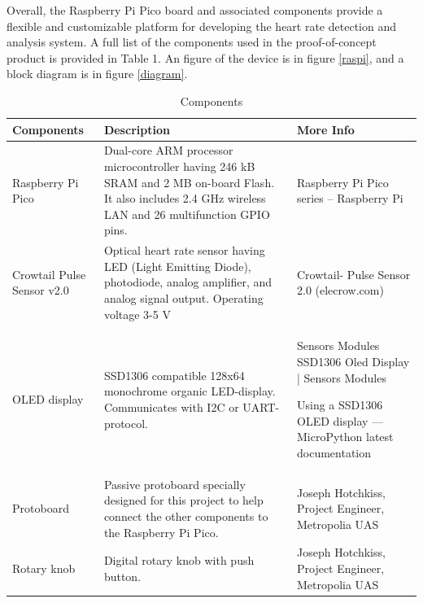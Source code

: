 \documentclass{article}
\begin{document}
Overall, the Raspberry Pi Pico board and associated components provide a flexible and customizable platform for developing the heart rate detection and analysis system. A full list of the components used in the proof-of-concept product is provided in Table 1. An figure of the device is in figure \ref{raspi}, and a block diagram is in figure \ref{diagram}.


\begin{table}[h]
\centering
\begin{tabular}{|p{2cm}|p{5.5cm}|p{4cm}|}
\hline
\textbf{Components} & \textbf{Description} & \textbf{More Info} \\ \hline
Raspberry Pi Pico & Dual-core ARM processor microcontroller having 246 kB SRAM and 2 MB on-board Flash. It also includes 2.4 GHz wireless LAN and 26 multifunction GPIO pins.    & Raspberry Pi Pico series – Raspberry Pi    \\ \hline
Crowtail Pulse Sensor v2.0   & Optical heart rate sensor having LED (Light Emitting Diode), photodiode, analog amplifier, and analog signal output. Operating voltage 3-5 V  & Crowtail- Pulse Sensor 2.0 (elecrow.com)   \\ \hline
OLED display   & SSD1306 compatible 128x64 monochrome organic LED-display. Communicates with I2C or UART-protocol.    & Sensors Modules SSD1306 Oled Display | Sensors Modules

Using a SSD1306 OLED display — MicroPython latest documentation    \\ \hline
Protoboard   & Passive protoboard specially designed for this project to help connect the other components to the Raspberry Pi Pico.   & Joseph Hotchkiss, Project Engineer, Metropolia UAS   \\ \hline
Rotary knob  & Digital rotary knob with push button.    & Joseph Hotchkiss, Project Engineer, Metropolia UAS   \\ \hline
\end{tabular}
\caption{Components}
\label{table:version-history}
\end{table}
\end{document}
